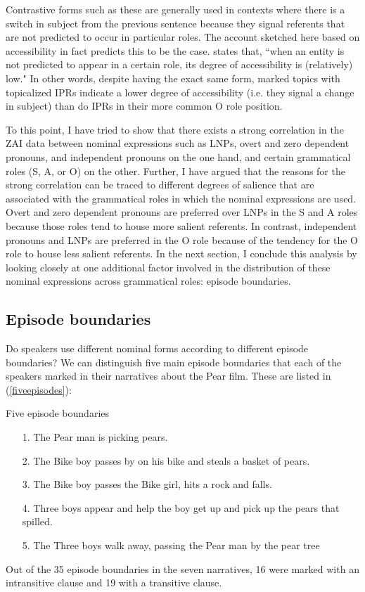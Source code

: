 Contrastive forms such as these are generally used in contexts where there is a switch in subject from the previous sentence because they signal referents that are not predicted to occur in particular roles. The account sketched here based on accessibility in fact predicts this to be the case. \citet[37]{ariel2001} states that, ``when an entity is not predicted to appear in a certain role, its degree of accessibility is (relatively) low." In other words, despite having the exact same form, marked topics with topicalized IPRs indicate a lower degree of accessibility (i.e. they signal a change in subject) than do IPRs in their more common O role position. 

To this point, I have tried to show that there exists a strong correlation in the ZAI data between nominal expressions such as LNPs, overt and zero dependent pronouns, and independent pronouns on the one hand, and certain grammatical roles (S, A, or O) on the other. Further, I have argued that the reasons for the strong correlation can be traced to different degrees of salience that are associated with the grammatical roles in which the nominal expressions are used. Overt and zero dependent pronouns are preferred over LNPs in the S and A roles because those roles tend to house more salient referents. In contrast, independent pronouns and LNPs are preferred in the O role because of the tendency for the O role to house less salient referents. In the next section, I conclude this analysis by looking closely at one additional factor involved in the distribution of these nominal expressions across grammatical roles: episode boundaries.


\subsection{Episode boundaries}\label{episodeboundaries}

Do speakers use different nominal forms according to different episode boundaries? We can distinguish five main episode boundaries that each of the speakers marked in their narratives about the Pear film. These are listed in (\ref{fiveepisodes}):

\ea\label{fiveepisodes} Five episode boundaries
\begin{itemize}
\item[1.] The Pear man is picking pears. 
\item[2.] The Bike boy passes by on his bike and steals a basket of pears. 
\item[3.] The Bike boy passes the Bike girl, hits a rock and falls. 
\item[4.] Three boys appear and help the boy get up and pick up the pears that spilled.
\item[5.] The Three boys walk away, passing the Pear man by the pear tree
\end{itemize}
\z
Out of the 35 episode boundaries in the seven narratives, 16 were marked with an intransitive clause and 19 with a transitive clause.

